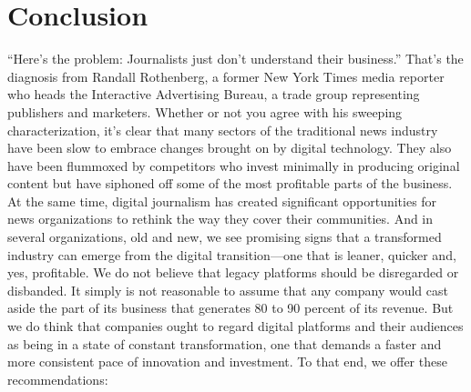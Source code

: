 \chapter{Conclusion}
``Here's the problem: Journalists just don't understand their business.''
That's the diagnosis from Randall Rothenberg, a former New York Times media
reporter who heads the Interactive Advertising Bureau, a trade group representing
publishers and marketers.
Whether or not you agree with his sweeping characterization, it's clear that
many sectors of the traditional news industry have been slow to embrace changes
brought on by digital technology. They also have been flummoxed by competitors
who invest minimally in producing original content but have siphoned off
some of the most profitable parts of the business.
At the same time, digital journalism has created significant opportunities for
news organizations to rethink the way they cover their communities. And in
several organizations, old and new, we see promising signs that a transformed
industry can emerge from the digital transition—one that is leaner, quicker and,
yes, profitable.
We do not believe that legacy platforms should be disregarded or disbanded.
It simply is not reasonable to assume that any company would cast aside the part
of its business that generates 80 to 90 percent of its revenue. But we do think
that companies ought to regard digital platforms and their audiences as being in
a state of constant transformation, one that demands a faster and more consistent
pace of innovation and investment.
To that end, we offer these recommendations:
